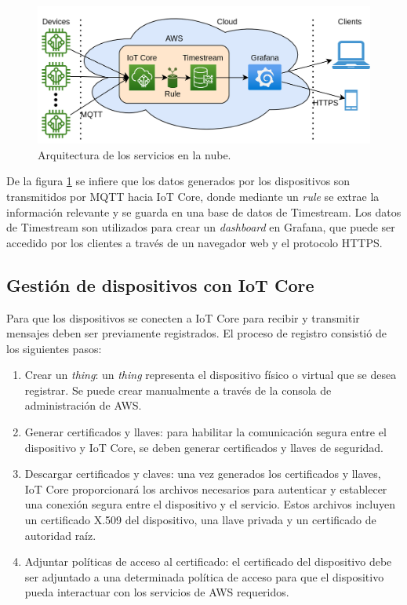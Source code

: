 \begin{figure}[h]
	\centering
	\includegraphics[scale=0.22]{./Figures/cc_diagram.png}
	\caption{Arquitectura de los servicios en la nube.}
	\label{fig:cc_diagram}
\end{figure}

De la figura \ref{fig:cc_diagram} se infiere que los datos generados por los dispositivos son transmitidos por MQTT hacia IoT Core, donde mediante un \textit{rule} se extrae la información relevante y se guarda en una base de datos de Timestream. Los datos de Timestream son utilizados para crear un \textit{dashboard} en Grafana, que puede ser accedido por los clientes a través de un navegador web y el protocolo HTTPS.

\subsection{Gestión de dispositivos con IoT Core}
\label{subsection3_3_1}
Para que los dispositivos se conecten a IoT Core para recibir y transmitir mensajes deben ser previamente registrados. El proceso de registro consistió de los siguientes pasos:

\begin{enumerate}
	\item Crear un \textit{thing}: un \textit{thing} representa el dispositivo físico o virtual que se desea registrar. Se puede crear manualmente a través de la consola de administración de AWS.
	\item Generar certificados y llaves: para habilitar la comunicación segura entre el dispositivo y IoT Core, se deben generar certificados y llaves de seguridad.
	\item Descargar certificados y claves: una vez generados los certificados y llaves, IoT Core proporcionará los archivos necesarios para autenticar y establecer una conexión segura entre el dispositivo y el servicio. Estos archivos incluyen un certificado X.509 \cite{x509_info} del dispositivo, una llave privada y un certificado de autoridad raíz.
	\item Adjuntar políticas de acceso al certificado: el certificado del dispositivo debe ser adjuntado a una determinada política de acceso para que el dispositivo pueda interactuar con los servicios de AWS requeridos.
\end{enumerate}

